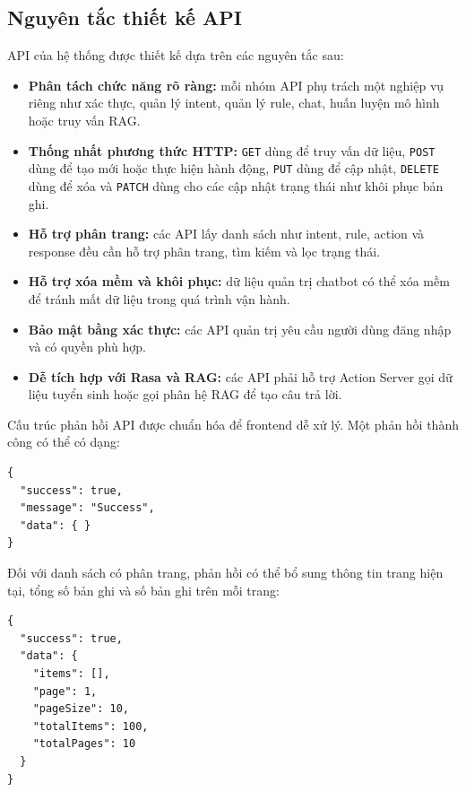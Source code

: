 \subsection{Nguyên tắc thiết kế API}

API của hệ thống được thiết kế dựa trên các nguyên tắc sau:

\begin{itemize}
    \item \textbf{Phân tách chức năng rõ ràng:} mỗi nhóm API phụ trách một nghiệp vụ riêng như xác thực, quản lý intent, quản lý rule, chat, huấn luyện mô hình hoặc truy vấn RAG.
    \item \textbf{Thống nhất phương thức HTTP:} \texttt{GET} dùng để truy vấn dữ liệu, \texttt{POST} dùng để tạo mới hoặc thực hiện hành động, \texttt{PUT} dùng để cập nhật, \texttt{DELETE} dùng để xóa và \texttt{PATCH} dùng cho các cập nhật trạng thái như khôi phục bản ghi.
    \item \textbf{Hỗ trợ phân trang:} các API lấy danh sách như intent, rule, action và response đều cần hỗ trợ phân trang, tìm kiếm và lọc trạng thái.
    \item \textbf{Hỗ trợ xóa mềm và khôi phục:} dữ liệu quản trị chatbot có thể xóa mềm để tránh mất dữ liệu trong quá trình vận hành.
    \item \textbf{Bảo mật bằng xác thực:} các API quản trị yêu cầu người dùng đăng nhập và có quyền phù hợp.
    \item \textbf{Dễ tích hợp với Rasa và RAG:} các API phải hỗ trợ Action Server gọi dữ liệu tuyển sinh hoặc gọi phân hệ RAG để tạo câu trả lời.
\end{itemize}

Cấu trúc phản hồi API được chuẩn hóa để frontend dễ xử lý. Một phản hồi thành công có thể có dạng:

\begin{verbatim}
{
  "success": true,
  "message": "Success",
  "data": { }
}
\end{verbatim}

Đối với danh sách có phân trang, phản hồi có thể bổ sung thông tin trang hiện tại, tổng số bản ghi và số bản ghi trên mỗi trang:

\begin{verbatim}
{
  "success": true,
  "data": {
    "items": [],
    "page": 1,
    "pageSize": 10,
    "totalItems": 100,
    "totalPages": 10
  }
}
\end{verbatim}
